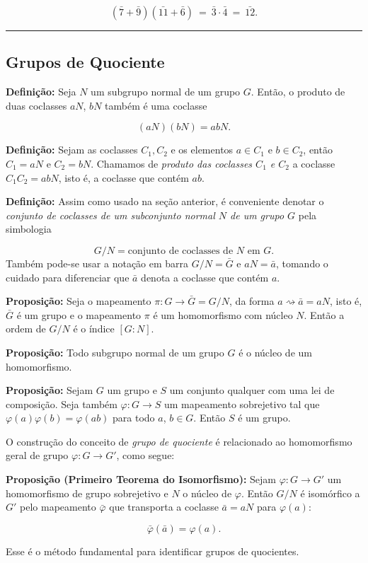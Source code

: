 \documentclass[11pt]{article}
\begin{document}
\[(\bar 7 + \bar 9)(\bar{11} + \bar 6) \ = \ \bar 3 \cdot \bar 4 \ = \ \bar{12}.\]

\begin{center}\rule{0.5\linewidth}{0.5pt}\end{center}

\hypertarget{grupos-de-quociente}{%
\subsection{Grupos de Quociente}\label{grupos-de-quociente}}

\textbf{Definição:} Seja \(N\) um subgrupo normal de um grupo \(G\).
Então, o produto de duas coclasses \(aN\), \(bN\) também é uma coclasse

\[(aN) (bN) = abN.\]

\textbf{Definição:} Sejam as coclasses \(C_1, C_2\) e os elementos
\(a\in C_1\) e \(b\in C_2\), então \(C_1 = aN\) e \(C_2 = bN\). Chamamos
de \emph{produto das coclasses \(C_1\) e \(C_2\)} a coclasse
\(C_1C_2 = abN\), isto é, a coclasse que contém \(ab\).

\textbf{Definição:} Assim como usado na seção anterior, é conveniente
denotar o \emph{conjunto de coclasses de um subconjunto normal \(N\) de
um grupo \(G\)} pela simbologia

\[G/N = \text{conjunto de coclasses de }N\text{ em }G.\] Também pode-se
usar a notação em barra \(G/N = \bar G\) e \(aN = \bar a\), tomando o
cuidado para diferenciar que \(\bar a\) denota a coclasse que contém
\(a\).

\textbf{Proposição:} Seja o mapeamento
\(\pi: G \longrightarrow \bar G = G/N\), da forma
\(a \rightsquigarrow \bar a = aN\), isto é, \(\bar G\) é um grupo e o
mapeamento \(\pi\) é um homomorfismo com núcleo \(N\). Então a ordem de
\(G/N\) é o índice \([G:N]\).

\textbf{Proposição:} Todo subgrupo normal de um grupo \(G\) é o núcleo
de um homomorfismo.

\textbf{Proposição:} Sejam \(G\) um grupo e \(S\) um conjunto qualquer
com uma lei de composição. Seja também \(\varphi:G\longrightarrow S\) um
mapeamento sobrejetivo tal que \(\varphi(a)\varphi(b) = \varphi(ab)\)
para todo \(a\), \(b\in G\). Então \(S\) é um grupo.

O construção do conceito de \emph{grupo de quociente} é relacionado ao
homomorfismo geral de grupo \(\varphi:G\longrightarrow G'\), como segue:

\textbf{Proposição (Primeiro Teorema do Isomorfismo):} Sejam
\(\varphi:G \longrightarrow G'\) um homomorfismo de grupo sobrejetivo e
\(N\) o núcleo de \(\varphi\). Então \(G/N\) é isomórfico a \(G'\) pelo
mapeamento \(\bar\varphi\) que transporta a coclasse \(\bar a = aN\)
para \(\varphi(a)\):

\[\bar\varphi(\bar a) = \varphi(a).\]

Esse é o método fundamental para identificar grupos de quocientes.


    
    
    
\end{document}
